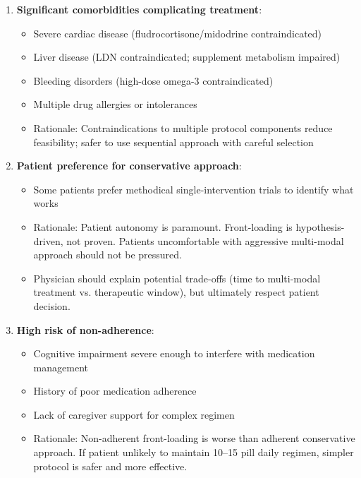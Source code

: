 \begin{warning}
\begin{enumerate}
    \item \textbf{Significant comorbidities complicating treatment}:
    \begin{itemize}
        \item Severe cardiac disease (fludrocortisone/midodrine contraindicated)
        \item Liver disease (LDN contraindicated; supplement metabolism impaired)
        \item Bleeding disorders (high-dose omega-3 contraindicated)
        \item Multiple drug allergies or intolerances
        \item Rationale: Contraindications to multiple protocol components reduce feasibility; safer to use sequential approach with careful selection
    \end{itemize}

    \item \textbf{Patient preference for conservative approach}:
    \begin{itemize}
        \item Some patients prefer methodical single-intervention trials to identify what works
        \item Rationale: Patient autonomy is paramount. Front-loading is hypothesis-driven, not proven. Patients uncomfortable with aggressive multi-modal approach should not be pressured.
        \item Physician should explain potential trade-offs (time to multi-modal treatment vs. therapeutic window), but ultimately respect patient decision.
    \end{itemize}

    \item \textbf{High risk of non-adherence}:
    \begin{itemize}
        \item Cognitive impairment severe enough to interfere with medication management
        \item History of poor medication adherence
        \item Lack of caregiver support for complex regimen
        \item Rationale: Non-adherent front-loading is worse than adherent conservative approach. If patient unlikely to maintain 10--15 pill daily regimen, simpler protocol is safer and more effective.
    \end{itemize}


\end{enumerate}
\end{warning}
